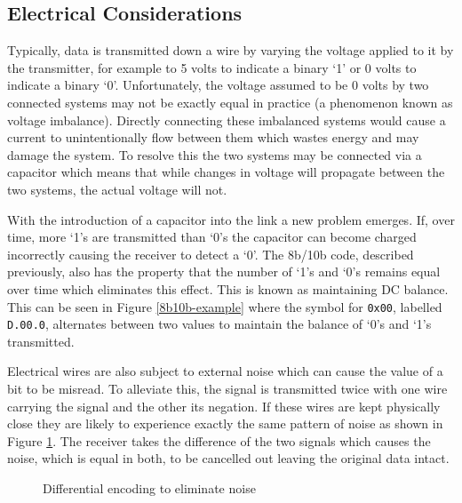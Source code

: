 		
		\subsection{Electrical Considerations}
			
			Typically, data is transmitted down a wire by varying the voltage applied
			to it by the transmitter, for example to 5 volts to indicate a binary `1'
			or 0 volts to indicate a binary `0'. Unfortunately, the voltage assumed to
			be 0 volts by two connected systems may not be exactly equal in practice
			(a phenomenon known as voltage imbalance). Directly connecting these
			imbalanced systems would cause a current to unintentionally flow between
			them which wastes energy and may damage the system. To resolve this the
			two systems may be connected via a capacitor which means that while
			changes in voltage will propagate between the two systems, the actual
			voltage will not.
			
			With the introduction of a capacitor into the link a new problem emerges.
			If, over time, more `1's are transmitted than `0's the capacitor can
			become charged incorrectly causing the receiver to detect a `0'. The
			8b/10b code, described previously, also has the property that the number
			of `1's and `0's remains equal over time which eliminates this effect.
			This is known as maintaining DC balance. This can be seen in Figure
			\ref{8b10b-example} where the symbol for \texttt{0x00}, labelled
			\texttt{D.00.0}, alternates between two values to maintain the balance of
			`0's and `1's transmitted.
			
			Electrical wires are also subject to external noise which can cause the
			value of a bit to be misread. To alleviate this, the signal is transmitted
			twice with one wire carrying the signal and the other its negation. If
			these wires are kept physically close they are likely to experience
			exactly the same pattern of noise as shown in Figure
			\ref{fig:differential-encoding}. The receiver takes the difference of the
			two signals which causes the noise, which is equal in both, to be
			cancelled out leaving the original data intact.
			
			\begin{figure}
				\center
				
				
				\caption{Differential encoding to eliminate noise}
				\label{fig:differential-encoding}
			\end{figure}
